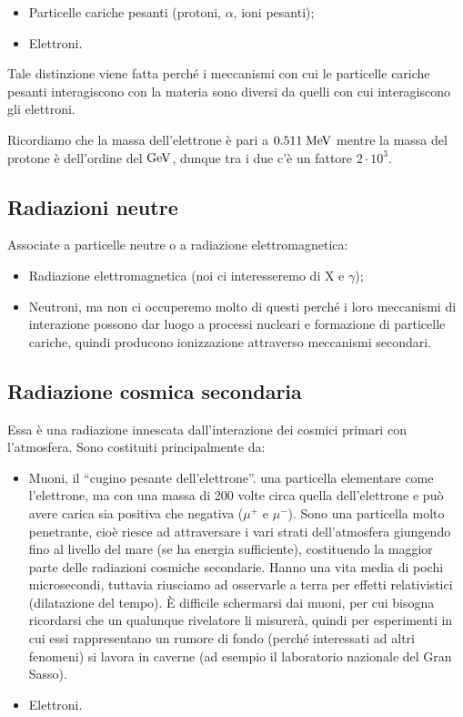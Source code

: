 \begin{itemize}[leftmargin=0.5cm]
    \item Particelle cariche pesanti (protoni, $\alpha$, ioni pesanti);
    \item Elettroni.
\end{itemize}

Tale distinzione viene fatta perché i meccanismi con cui le particelle cariche pesanti interagiscono con la materia sono diversi da quelli con cui interagiscono gli elettroni.

Ricordiamo che la massa dell'elettrone è pari a $0.511 \; \rm MeV$ mentre la massa del protone è dell'ordine del $\rm GeV$, dunque tra i due c'è un fattore $2 \cdot 10^3$.

\subsection{Radiazioni neutre}
Associate a particelle neutre o a radiazione elettromagnetica:

\begin{itemize}[leftmargin=0.5cm]
    \item Radiazione elettromagnetica (noi ci interesseremo di X e $\gamma$);
    \item Neutroni, ma non ci occuperemo molto di questi perché i loro meccanismi di interazione possono dar luogo a processi nucleari e formazione di particelle cariche, quindi producono ionizzazione attraverso meccanismi secondari.
\end{itemize}

\subsection{Radiazione cosmica secondaria}
Essa è una radiazione innescata dall'interazione dei cosmici primari con l'atmosfera. Sono costituiti principalmente da:

\begin{itemize}[leftmargin=0.5cm]
    \item Muoni, il ``cugino pesante dell'elettrone''. \E una particella elementare come l'elettrone, ma con una massa di 200 volte circa quella dell'elettrone e può avere carica sia positiva che negativa ($\mu^{+}$ e $\mu^{-}$). Sono una particella molto penetrante, cioè riesce ad attraversare i vari strati dell'atmosfera giungendo fino al livello del mare (se ha energia sufficiente), costituendo la maggior parte delle radiazioni cosmiche secondarie. Hanno una vita media di pochi microsecondi, tuttavia riusciamo ad osservarle a terra per effetti relativistici (dilatazione del tempo). È difficile schermarsi dai muoni, per cui bisogna ricordarsi che un qualunque rivelatore li misurerà, quindi per esperimenti in cui essi rappresentano un rumore di fondo (perché interessati ad altri fenomeni) si lavora in caverne (ad esempio il laboratorio nazionale del Gran Sasso).
    \item Elettroni.
\end{itemize}

